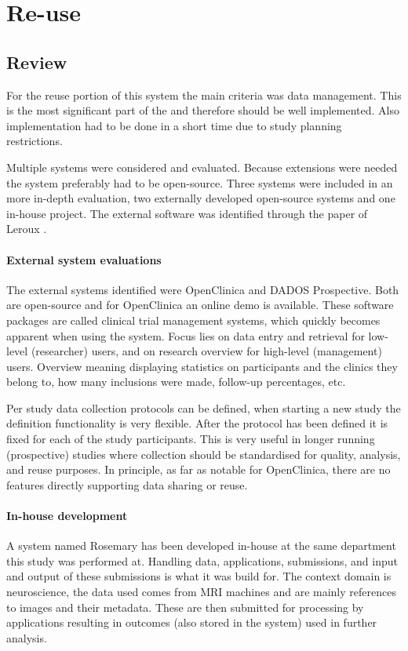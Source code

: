 \section{Re-use}
\label{reuse}

\subsection{Review}
\label{reuse-review}

For the reuse portion of this system the main criteria was data management.
This is the most significant part of the \ivfsystem{} and therefore should be well implemented.
Also implementation had to be done in a short time due to study planning restrictions.

Multiple systems were considered and evaluated.
Because extensions were needed the system preferably had to be open-source.
Three systems were included in an more in-depth evaluation, two externally developed open-source systems and one in-house project.
The external software was identified through the paper of Leroux \cite{leroux2011}.

\paragraph{External system evaluations}
The external systems identified were OpenClinica and DADOS Prospective.
Both are open-source and for OpenClinica an online demo is available.
These software packages are called clinical trial management systems, which quickly becomes apparent when using the system.
Focus lies on data entry and retrieval for low-level (researcher) users, and on research overview for high-level (management) users.
Overview meaning displaying statistics on participants and the clinics they belong to, how many inclusions were made, follow-up percentages, etc.

Per study data collection protocols can be defined, when starting a new study the definition functionality is very flexible.
After the protocol has been defined it is fixed for each of the study participants.
This is very useful in longer running (prospective) studies where collection should be standardised for quality, analysis, and reuse purposes.
In principle, as far as notable for OpenClinica, there are no features directly supporting data sharing or reuse.

\paragraph{In-house development}
A system named Rosemary has been developed in-house at the same department this study was performed at.
Handling data, applications, submissions, and input and output of these submissions is what it was build for.
The context domain is neuroscience, the data used comes from MRI machines and are mainly references to images and their metadata.
These are then submitted for processing by applications resulting in outcomes (also stored in the system) used in further analysis.

